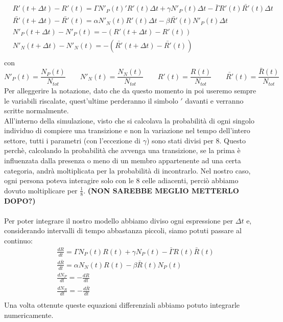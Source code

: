 \begin{equation} \label{eq: 1.3}
	\begin{aligned}
		&R'(t+\Delta t)-R'(t)=\Gamma N'_P(t)'R'(t)\Delta t+\gamma N'_P(t)\Delta t-\bar{\Gamma}R'(t)\bar{R'}(t)\Delta t\\
	&\bar{R'}(t+\Delta t)-\bar{R'}(t)=\alpha N'_N(t)R'(t)\Delta t-\beta \bar{R'}(t)N'_P(t)\Delta t\\
	&N'_P(t+\Delta t)-N'_P(t)=-(R'(t+\Delta t)-R'(t))\\
	&N'_N(t+\Delta t)-N'_N(t)=-(\bar{R'}(t+\Delta t)-\bar{R'}(t))\\
	\end{aligned}
\end{equation}	
con 
\begin{equation*}
	N'_{P}(t)=\frac{N_{P}(t)}{N_{tot}} \qquad 	N'_{N}(t)=\frac{N_{N}(t)}{N_{tot}} \qquad	R'(t)=\frac{R(t)}{N_{tot}} \qquad	\bar{R'}(t)=\frac{\bar{R}(t)}{N_{tot}} 
\end{equation*}
Per alleggerire la notazione, dato che da questo momento in poi useremo sempre le variabili riscalate, quest'ultime perderanno il simbolo $ ' $ davanti e verranno scritte normalmente. \\
All'interno della simulazione, visto che si calcolava la probabilità di ogni singolo individuo di compiere una transizione e non la variazione nel tempo dell'intero settore, tutti i parametri (con l'eccezione di $ \gamma $) sono stati divisi per 8. Questo perchè, calcolando la probabilità che avvenga una transizione, se la prima è influenzata dalla presenza o meno di un membro appartenente ad una certa categoria, andrà moltiplicata per la probabilità di incontrarlo. Nel nostro caso, ogni persona poteva interagire solo con le 8 celle adiacenti, perciò abbiamo dovuto moltiplicare per $ \frac{1}{8} $.
\textbf{(NON SAREBBE MEGLIO METTERLO DOPO?)}
\\\\ 
Per poter integrare il nostro modello abbiamo diviso ogni espressione per $ \Delta t $ e, considerando intervalli di tempo abbastanza piccoli, siamo potuti passare al continuo:
\begin{equation} \label{eq:1.4}
		\begin{aligned}
			&\frac{dR}{dt}=\Gamma N_P(t) R(t)+\gamma N_P(t)-\bar{\Gamma}R(t)\bar{R}(t)\\
		&\frac{d\bar{R}}{dt}=\alpha N_N(t)R(t)-\beta \bar{R}(t)N_P(t)\\
		&\frac{dN_{P}}{dt}= -\frac{dR}{dt}\\
		&\frac{dN_{R}}{dt}= -\frac{d\bar{R}}{dt}\\
		\end{aligned}
\end{equation}
Una volta ottenute queste equazioni differenziali abbiamo potuto integrarle numericamente.\\
